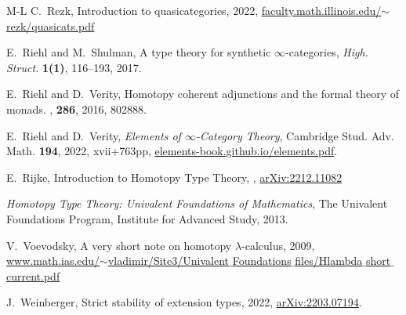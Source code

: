 \documentclass[11pt]{ctexart}
\theoremstyle{definition}
\theoremstyle{remark}
\numberwithin{equation}{section}
\newcommand{\1}{\mathbbe{1}}
\newcommand{\2}{\mathbbe{2}}
\newcommand{\3}{\mathbbe{3}}
\begin{document}
\begin{thebibliography}{M-L}
     C.~Rezk, Introduction to quasicategories, 2022, \href{https://faculty.math.illinois.edu/~rezk/quasicats.pdf}{faculty.math.illinois.edu/$\sim$rezk/quasicats.pdf}
    
     E.~Riehl and M.~Shulman, A type theory for synthetic $\infty$-categories, {\em High. Struct.} {\bf 1(1)}, 116--193, 2017.

    
E.~Riehl and D.~Verity,
\newblock Homotopy coherent adjunctions and the formal theory of monads.
, {\bf 286},  2016, 802{\textendash}888.

 E.~Riehl and D.~Verity,
\newblock \emph{Elements of $\infty$-Category Theory},
\newblock Cambridge Stud. Adv. Math.  {\bf 194}, 2022, xvii+763pp,  \href{https:elements-book.github.io/elements.pdf}{elements-book.github.io/elements.pdf}.
    

     E.~Rijke, \newblock Introduction to Homotopy Type Theory, , \href{https://arxiv.org/abs/2212.11082}{arXiv:2212.11082}

 \emph{Homotopy Type Theory: Univalent Foundations of Mathematics}, The Univalent Foundations Program, Institute for Advanced Study, 2013. 

 V.~Voevodsky, A very short note on homotopy $\lambda$-calculus, 2009,\\  \href{https://www.math.ias.edu/~vladimir/Site3/Univalent_Foundations_files/Hlambda_short_current.pdf}{www.math.ias.edu/$\sim$vladimir/Site3/Univalent$\_$Foundations$\_$files/Hlambda$\_$short$\_$current.pdf}

 J.~Weinberger, Strict stability of extension types, 2022, \href{https://arxiv.org/abs/2203.07194}{arXiv:2203.07194}.

    
    \end{thebibliography}
    
\end{document}
